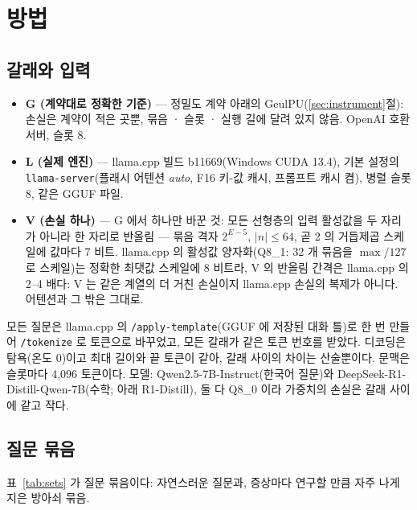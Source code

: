 \documentclass[11pt]{article}
\begin{document}
\section{방법}\label{sec:method}

\subsection{갈래와 입력}\label{sec:arms}

\begin{itemize}
\item \textbf{G (계약대로 정확한 기준)} --- 정밀도 계약 아래의 GeulPU(\ref{sec:instrument}절): 손실은 계약이 적은 곳뿐, 묶음 ·
      슬롯 · 실행 길에 달려 있지 않음. OpenAI 호환 서버, 슬롯 8.
\item \textbf{L (실제 엔진)} --- llama.cpp 빌드 b11669\allowbreak(Windows CUDA 13.4), 기본 설정의
      \texttt{llama-server}\allowbreak(플래시 어텐션 \emph{auto}, F16 키-값 캐시, 프롬프트 캐시 켬), 병렬 슬롯 8, 같은 GGUF
      파일.
\item \textbf{V (손실 하나)} --- G 에서 하나만 바꾼 것: 모든 선형층의 입력 활성값을 두 자리가 아니라 한 자리로 반올림 --- 묶음
      격자 $2^{E-5}$, $|n|\le 64$, 곧 2 의 거듭제곱 스케일에 값마다 7 비트. llama.cpp 의 활성값 양자화(Q8\_1: 32 개 묶음을
      $\max/127$ 로 스케일)는 정확한 최댓값 스케일에 8 비트라, V 의 반올림 간격은 llama.cpp 의 2--4 배다: V 는 같은 계열의 더
      거친 손실이지 llama.cpp 손실의 복제가 아니다. 어텐션과 그 밖은 그대로.
\end{itemize}

모든 질문은 llama.cpp 의 \texttt{/apply-template}(GGUF 에 저장된 대화 틀)로 한 번 만들어 \texttt{/tokenize} 로 토큰으로
바꾸었고, 모든 갈래가 같은 토큰 번호를 받았다. 디코딩은 탐욕(온도 0)이고 최대 길이와 끝 토큰이 같아, 갈래 사이의 차이는
산술뿐이다. 문맥은 슬롯마다 4,096 토큰이다. 모델: Qwen2.5-7B-Instruct(한국어 질문)와 DeepSeek-R1-Distill-Qwen-7B(수학; 아래
R1-Distill), 둘 다 Q8\_0 이라 가중치의 손실은 갈래 사이에 같고 작다.

\subsection{질문 묶음}\label{sec:sets}

표~\ref{tab:sets} 가 질문 묶음이다: 자연스러운 질문과, 증상마다 연구할 만큼 자주 나게 지은 방아쇠 묶음.
\end{document}
